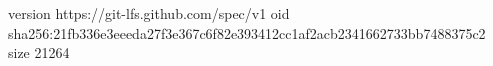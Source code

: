 version https://git-lfs.github.com/spec/v1
oid sha256:21fb336e3eeeda27f3e367c6f82e393412cc1af2acb2341662733bb7488375c2
size 21264
